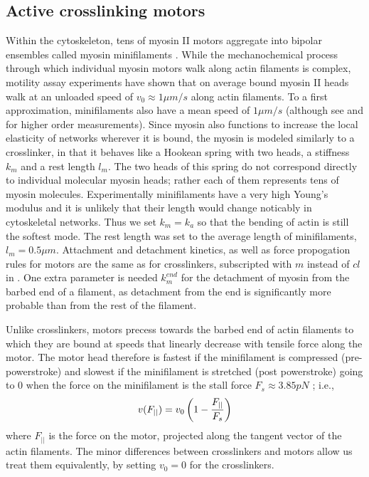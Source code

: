 \documentclass[12pt]{article}
\begin{document}
\subsection{Active crosslinking motors}
Within the cytoskeleton, tens of myosin II motors aggregate into bipolar ensembles called myosin minifilaments
\cite{stam2015}. While the mechanochemical process through which individual myosin motors walk along actin filaments is complex, 
motility assay experiments have shown that on average bound myosin II heads walk at an unloaded speed of $v_0\approx1\mu m/s$ along actin
filaments\cite{finer1994}. To a first approximation, minifilaments also 
have a mean speed of $1\mu m/s$ (although see \cite{stam2015} and \cite{walcott2012} for higher order measurements). 
Since myosin also functions to increase the local elasticity of networks wherever it is bound, the myosin is modeled
similarly to a crosslinker, in that it behaves like a Hookean spring with two heads, a stiffness $k_{m}$ and a rest
length $l_m$. The two heads of this spring do not correspond directly to individual
molecular myosin heads; rather each of them represents tens of myosin molecules. 
Experimentally minifilaments have a very high
Young's modulus and it is unlikely that their length would change noticably in cytoskeletal networks.
Thus we set $k_m=k_a$ so that the bending of actin is still the softest mode. 
The rest length was set to the average length of minifilaments, $l_m=0.5\mu m$\cite{niederman1975}.
Attachment and detachment kinetics, as well as force propogation rules
for motors are the same as for crosslinkers, subscripted with $m$
instead of $cl$ in . One extra parameter is needed $k_m^{end}$ for the
detachment of myosin from the barbed end of a filament, as detachment from the end is significantly more probable than
from the rest of the filament.
\par
Unlike crosslinkers, motors precess towards the barbed end of actin filaments to which they are bound 
at speeds that linearly decrease with tensile force along the motor. 
The motor head therefore is fastest if the minifilament is
compressed (pre-powerstroke) and slowest if the minifilament is stretched (post powerstroke) 
going to $0$ when the force on the minifilament is the stall force $F_s\approx 3.85pN$ \cite{nedelec2002, gordon2012}; i.e.,  
\begin{equation} 
  v(F_{||}) = v_0\left( 1-{F_{||}\over F_s} \right)
    \label{eqn:myo_vel}
\end{equation} 
where $F_{||}$ is the force on the motor, projected along the tangent vector of the
actin filaments.
The minor differences between crosslinkers and motors allow us treat them equivalently, by 
setting $v_0 = 0$ for the crosslinkers.  
\end{document}
